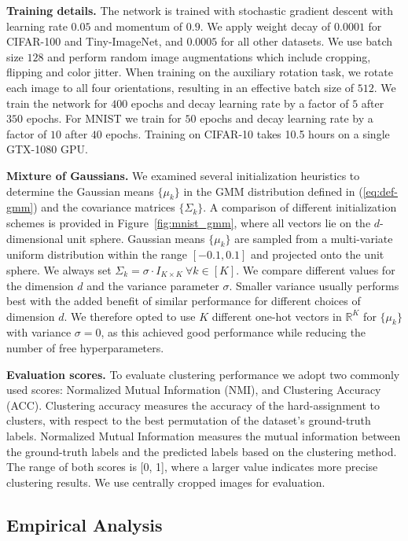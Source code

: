 \documentclass[a4paper,conference]{IEEEtran}
\begin{document}
\textbf{Training details.} 
The network is trained with stochastic gradient descent with learning rate $0.05$ and momentum of $0.9$. We apply weight decay of $0.0001$ for CIFAR-100 and Tiny-ImageNet, and $0.0005$ for all other datasets. We use batch size $128$ and perform random image augmentations which include cropping, flipping and color jitter. When training on the auxiliary rotation task, we rotate each image to all four orientations, resulting in an effective batch size of $512$. We train the network for $400$ epochs and decay learning rate by a factor of $5$ after $350$ epochs. For MNIST we train for $50$ epochs and decay learning rate by a factor of $10$ after $40$ epochs. Training on CIFAR-10 takes 10.5 hours on a single GTX-1080 GPU.

\textbf{Mixture of Gaussians.} We examined several initialization heuristics to determine the Gaussian means $\{\mu_k\}$ in the GMM distribution defined in (\ref{eq:def-gmm}) and the covariance matrices $\{\Sigma_k\}$. A comparison of different initialization schemes is provided in Figure~\ref{fig:mnist_gmm}, where all vectors lie on the $d$-dimensional unit sphere. Gaussian means $\{\mu_k\}$ are sampled from a multi-variate uniform distribution within the range $[-0.1,0.1]$ and projected onto the unit sphere. We always set $\Sigma_k=\sigma \cdot I_{K \times K} \ \forall k \in [K]$. We compare different values for the dimension $d$ and the variance parameter $\sigma$. Smaller variance usually performs best with the added benefit of similar performance for different choices of dimension $d$. We therefore opted to use $K$ different one-hot vectors in $\mathbb{R}^K$ for $\{\mu_k\}$ with variance $\sigma=0$, as this achieved good performance while reducing the number of free hyperparameters.

\textbf{Evaluation scores.} 
To evaluate clustering performance we adopt two commonly used scores: Normalized Mutual Information (NMI), and Clustering Accuracy (ACC). Clustering accuracy measures the accuracy of
the hard-assignment to clusters, with respect to the best permutation of the dataset’s ground-truth labels. Normalized Mutual Information measures the mutual information between the ground-truth labels and the predicted labels based on the clustering method. The range of both scores is [0, 1], where a larger value indicates more precise clustering results. We use centrally cropped images for evaluation.

\subsection{Empirical Analysis}
\end{document}
